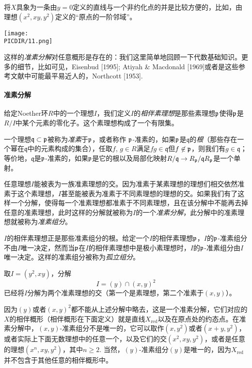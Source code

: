将$X$具象为一条由$y=0$定义的直线与一个非约化点的并是比较方便的，比如，由理想$(x^2,xy,y^2)$定义的“原点的一阶邻域”。

\begin{center}\texttt{[image: \\PICDIR/11.png]}\end{center}

这样的\textit{准素分解}对任意概形是存在的：我们这里简单地回顾一下代数基础知识。更多的细节，比如可见，Eisenbud [1995]; Atiyah \& Macdonald [1969]或者是这些参考文献中可能最平易近人的，Northcott [1953].

\paragraph*{准素分解} 
给定Noether环$R$中的一个理想$I$，我们定义$I$的\textit{相伴素理想}是那些素理想$\mathfrak{p}$使得$\mathfrak{p}$是$R/I$中某个元素的零化子。这个素理想构成了一个有限集。

一个理想$\mathfrak{q}\subset \mathfrak{p}$被称为\textit{准素}于$\mathfrak{p}$，或者称作
$\mathfrak{p}$-准素的，如果$\mathfrak{p}$是$\mathfrak{q}$的\textit{根}（那些存在一个幂在$\mathfrak{q}$中的元素构成的集合），任取$f$, $g\in R$满足$fg\in \mathfrak{q}$但$f\not\in \mathfrak{p}$，则我们有$g\in\mathfrak{q}$；等价地，$\mathfrak{q}$是$\mathfrak{p}$-准素的，如果$\mathfrak{p}$是它的根以及局部化映射$R/\mathfrak{q}\to R_{\mathfrak{p}}/\mathfrak{q}R_{\mathfrak{p}}$是一个单射。

任意理想$I$能被表为一族准素理想的交。因为准素于某素理想的理想们相交依然准素于这个素理想，$I$甚至能被表为准素于不同素理想的理想的交。如果我们有了这样一个分解，使得每一个准素理想都准素于不同素理想，且在该分解中不能再去掉任意的准素理想，此时这样的分解就被称为$I$的一个\textit{准素分解}，此分解中的准素理想就被称为\textit{准素组分}。

$I$的相伴素理想正是那些准素组分的根。给定一个$I$的相伴素理想$\mathfrak{p}$，$I$的$\mathfrak{p}$-准素组分不由$I$唯一决定，然而当$\mathfrak{p}$在$I$的相伴素理想中是极小素理想时，$I$的$\mathfrak{p}$-准素组分由$I$唯一决定。这样的准素组分被称为\textit{孤立组分}。

\begin{exe}
	取$I=(y^2,xy)$，分解
	\[
	I=(y)\cap (x,y)^2
	\]
	已经将$I$分解为两个准素理想的交（第一个是素理想，第二个准素于$(x,y)$）。
\end{exe}

因为$(y)$或者$(x,y)^2$都不能从上述分解中略去，这是一个准素分解，它们对应的$X$的相伴概形（相伴概形在下面定义）就是直线$X_{\mathrm{red}}$以及在原点处的约态点。在准素分解中，$(x,y)$\hyp 准素组分不是唯一的，它可以取作$(x,y^2)$或者$(x+y,y^2)$，或者实际上下面无数理想中的任意一个，以及它们的交$(x^2,xy,y^2)$，或者是任意的理想$(x^n,xy,y^2)$，其中$n\geq 2$. 当然，$(y)$\hyp 准素组分$(y)$是唯一的，因为$X_{\mathrm{red}}$并不包含于其他任意的相伴概形中。

